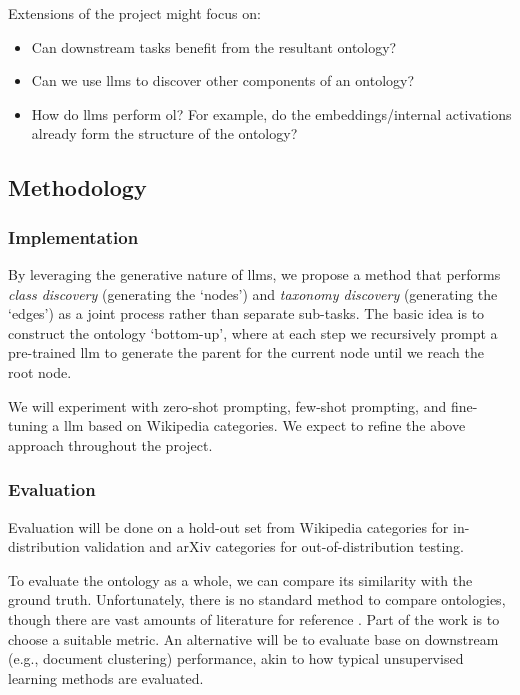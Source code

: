 Extensions of the project might focus on:
\begin{itemize}
    \item Can downstream tasks benefit from the resultant ontology?
    \item Can we use \gls{llm}s to discover other components of an ontology?
    \item How do \gls{llm}s perform \gls{ol}? For example, do the embeddings/internal activations already form the structure of the ontology?
\end{itemize}


\subsection*{Methodology}

\subsubsection*{Implementation}

By leveraging the generative nature of \gls{llm}s, we propose a method that performs \emph{class discovery} (generating the `nodes') and \emph{taxonomy discovery} (generating the `edges') as a joint process rather than separate sub-tasks. The basic idea is to construct the ontology `bottom-up', where at each step we recursively prompt a pre-trained \gls{llm} to generate the parent for the current node until we reach the root node.

We will experiment with zero-shot prompting, few-shot prompting, and fine-tuning a \gls{llm} based on Wikipedia categories. We expect to refine the above approach throughout the project.

\subsubsection*{Evaluation}

Evaluation will be done on a hold-out set from Wikipedia categories for in-distribution validation and arXiv categories for out-of-distribution testing.

To evaluate the ontology as a whole, we can compare its similarity with the ground truth. Unfortunately, there is no standard method to compare ontologies, though there are vast amounts of literature for reference \citep{ontology-matching}. Part of the work is to choose a suitable metric. An alternative will be to evaluate base on downstream (e.g., document clustering) performance, akin to how typical unsupervised learning methods are evaluated.

